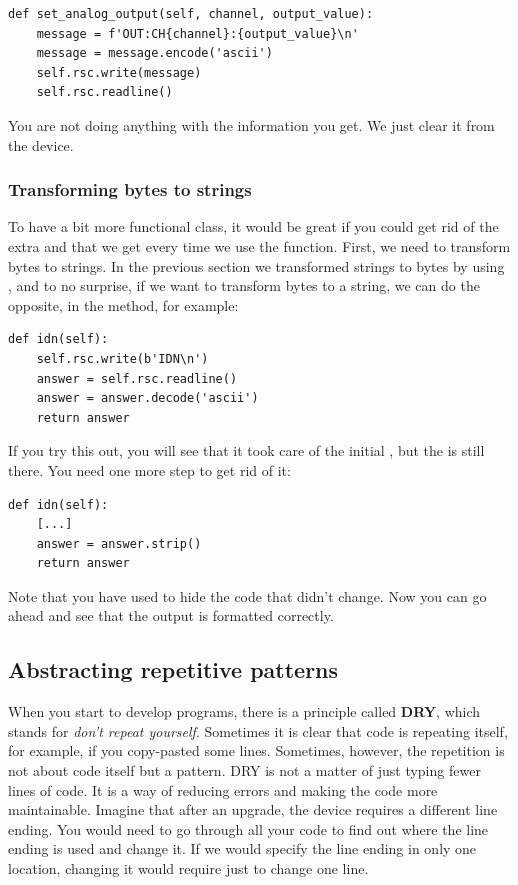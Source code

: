 \begin{verbatim}
def set_analog_output(self, channel, output_value):
    message = f'OUT:CH{channel}:{output_value}\n'
    message = message.encode('ascii')
    self.rsc.write(message)
    self.rsc.readline()
\end{verbatim}

You are not doing anything with the information you get. We just clear it from the device.

\subsubsection{Transforming bytes to strings}
To have a bit more functional class, it would be great if you could get rid of the extra  and \py{\n} that we get every time we use the  function. First, we need to transform bytes to strings. In the previous section we transformed strings to bytes by using , and to no surprise, if we want to transform bytes to a string, we can do the opposite, in the  method, for example:

\begin{verbatim}
def idn(self):
    self.rsc.write(b'IDN\n')
    answer = self.rsc.readline()
    answer = answer.decode('ascii')
    return answer
\end{verbatim}

If you try this out, you will see that it took care of the initial , but the \py{\n} is still there. You need one more step to get rid of it:

\begin{verbatim}
def idn(self):
    [...]
    answer = answer.strip()
    return answer
\end{verbatim}

Note that you have used %
\py{[...]} to hide the code that didn't change. Now you can go ahead and see that the output is formatted correctly.


\subsection{Abstracting repetitive patterns}\label{subsec:abstracting-repetitive-patterns}
When you start to develop programs, there is a principle called \textbf{DRY}, which stands for \emph{don't repeat yourself}. Sometimes it is clear that code is repeating itself, for example, if you copy-pasted some lines. Sometimes, however, the repetition is not about code itself but a pattern. {DRY} is not a matter of just typing fewer lines of code. It is a way of reducing errors and making the code more maintainable. Imagine that after an upgrade, the device requires a different line ending. You would need to go through all your code to find out where the line ending is used and change it. If we would specify the line ending in only one location, changing it would require just to change one line.

